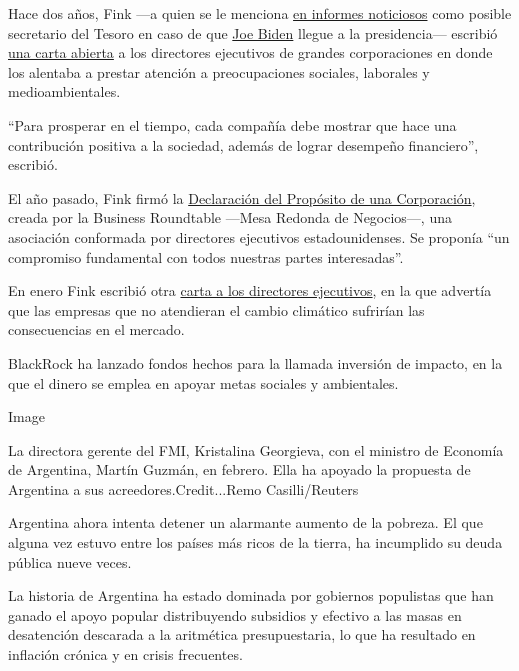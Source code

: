 Hace dos años, Fink ---a quien se le menciona
\href{https://www.cnbc.com/2020/04/06/biden-donors-float-elizabeth-warren-larry-fink-others-for-key-roles.html}{en
informes noticiosos} como posible secretario del Tesoro en caso de que
\href{https://www.nytimes3xbfgragh.onion/es/interactive/2020/espanol/estados-unidos/joe-biden-elecciones.html}{Joe
Biden} llegue a la presidencia--- escribió
\href{http://www.corporance.es/wp-content/uploads/2018/01/Larry-Fink-letter-to-CEOs-2018-1.pdf}{una
carta abierta} a los directores ejecutivos de grandes corporaciones en
donde los alentaba a prestar atención a preocupaciones sociales,
laborales y medioambientales.

``Para prosperar en el tiempo, cada compañía debe mostrar que hace una
contribución positiva a la sociedad, además de lograr desempeño
financiero'', escribió.

El año pasado, Fink firmó la
\href{https://www.nytimes3xbfgragh.onion/2019/08/19/business/business-roundtable-ceos-corporations.html}{Declaración
del Propósito de una Corporación}, creada por la Business Roundtable
---Mesa Redonda de Negocios---, una asociación conformada por directores
ejecutivos estadounidenses. Se proponía ``un compromiso fundamental con
todos nuestras partes interesadas''.

En enero Fink escribió otra
\href{https://www.blackrock.com/corporate/investor-relations/larry-fink-ceo-letter}{carta
a los directores ejecutivos}, en la que advertía que las empresas que no
atendieran el cambio climático sufrirían las consecuencias en el
mercado.

BlackRock ha lanzado fondos hechos para la llamada inversión de impacto,
en la que el dinero se emplea en apoyar metas sociales y ambientales.

Image

La directora gerente del FMI, Kristalina Georgieva, con el ministro de
Economía de Argentina, Martín Guzmán, en febrero. Ella ha apoyado la
propuesta de Argentina a sus acreedores.Credit...Remo Casilli/Reuters

Argentina ahora intenta detener un alarmante aumento de la pobreza. El
que alguna vez estuvo entre los países más ricos de la tierra, ha
incumplido su deuda pública nueve veces.

La historia de Argentina ha estado dominada por gobiernos populistas que
han ganado el apoyo popular distribuyendo subsidios y efectivo a las
masas en desatención descarada a la aritmética presupuestaria, lo que ha
resultado en inflación crónica y en crisis frecuentes.

